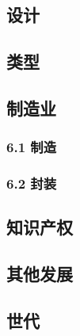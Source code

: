 \subsection{设计}



\subsection{类型}



\subsection{制造业}



\subsubsection{6.1 制造}



\subsubsection{6.2 封装}



\subsection{知识产权}



\subsection{其他发展}



\subsection{世代}



